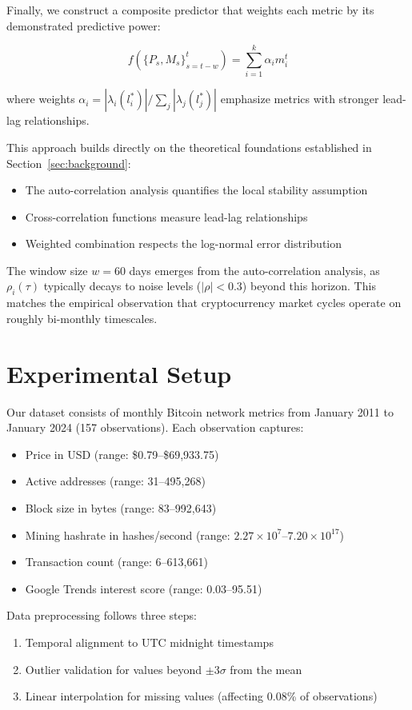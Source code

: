 \documentclass{article} %
\begin{document}
Finally, we construct a composite predictor that weights each metric by its demonstrated predictive power:

\begin{equation}
f(\{P_s, M_s\}_{s=t-w}^t) = \sum_{i=1}^k \alpha_i m_i^t
\end{equation}

where weights $\alpha_i = |\lambda_i(l^*_i)| / \sum_j |\lambda_j(l^*_j)|$ emphasize metrics with stronger lead-lag relationships.

This approach builds directly on the theoretical foundations established in Section~\ref{sec:background}:
\begin{itemize}
    \item The auto-correlation analysis quantifies the local stability assumption
    \item Cross-correlation functions measure lead-lag relationships
    \item Weighted combination respects the log-normal error distribution
\end{itemize}

The window size $w=60$ days emerges from the auto-correlation analysis, as $\rho_i(\tau)$ typically decays to noise levels ($|\rho| < 0.3$) beyond this horizon. This matches the empirical observation that cryptocurrency market cycles operate on roughly bi-monthly timescales.

\section{Experimental Setup}
\label{sec:experimental}

Our dataset consists of monthly Bitcoin network metrics from January 2011 to January 2024 (157 observations). Each observation captures:
\begin{itemize}
    \item Price in USD (range: \$0.79--\$69,933.75)
    \item Active addresses (range: 31--495,268)
    \item Block size in bytes (range: 83--992,643)
    \item Mining hashrate in hashes/second (range: $2.27 \times 10^7$--$7.20 \times 10^{17}$)
    \item Transaction count (range: 6--613,661)
    \item Google Trends interest score (range: 0.03--95.51)
\end{itemize}

Data preprocessing follows three steps:
\begin{enumerate}
    \item Temporal alignment to UTC midnight timestamps
    \item Outlier validation for values beyond $\pm 3\sigma$ from the mean
    \item Linear interpolation for missing values (affecting 0.08\% of observations)
\end{enumerate}
\end{document}
